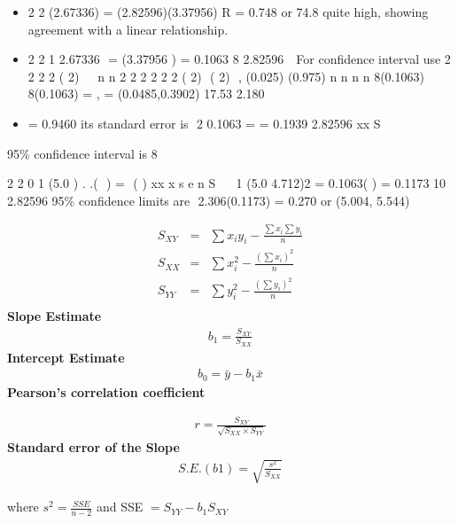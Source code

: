 \documentclass[a4paper,12pt]{article}
\begin{document}
\begin{itemize}
    \item 

2
2 (2.67336)
=
(2.82596)(3.37956)
R = 0.748 or 74.8%
quite high, showing agreement with a linear relationship.
\item
2
2 1 2.67336
 = (3.37956 ) = 0.1063
8 2.82596
 
For confidence interval use
2
2
2 2
( 2) 
~ n
n
2 2
2 2
2 2
( 2)  ( 2) 
,
(0.025) (0.975) n n
n n
8(0.1063) 8(0.1063)
= , = (0.0485,0.3902)
17.53 2.180
\item 
= 0.9460
its standard error is
 2 0.1063
= = 0.1939
2.82596 xx S
\end{itemize}
95\% confidence interval is 8

2
2
0
1 (5.0 )
. .(  ) =  ( )
xx
x
s e
n S

  
1 (5.0 4.712)2
= 0.1063( ) = 0.1173
10 2.82596
95\% confidence limits are  2.306(0.1173) =  0.270 or (5.004, 5.544)



\newpage


\begin{eqnarray*}
	S_{XY} &=&
	\sum x_iy_i - \frac{\sum x_i\sum y_i}{n}\\
	S_{XX} &=&
	\sum x_i^2 - \frac{(\sum x_i)^2}{n}\\
	S_{YY} &=&
	\sum y_i^2 - \frac{(\sum y_i)^2}{n}\\
\end{eqnarray*}
{\bf Slope Estimate}
\begin{eqnarray*}
	b_1 = \frac{S_{XY}}{S_{XX}}
\end{eqnarray*}
{\bf Intercept Estimate}
\begin{eqnarray*}
	b_0 = \bar{y} -b_1\bar{x}
\end{eqnarray*}
{\bf Pearson's correlation coefficient}

\begin{eqnarray*}
	r = \frac{S_{XY}}{\sqrt{S_{XX} \times S_{YY}}}
\end{eqnarray*}
{\bf Standard error of the Slope}
\begin{eqnarray*}
	S.E.(b1) = \sqrt{\frac{s^2}{S_{XX}}}
\end{eqnarray*}

where $s^2 = \frac{SSE}{n-2}$
and SSE $= S_{YY} - b_1S_{XY}$
\end{document}

